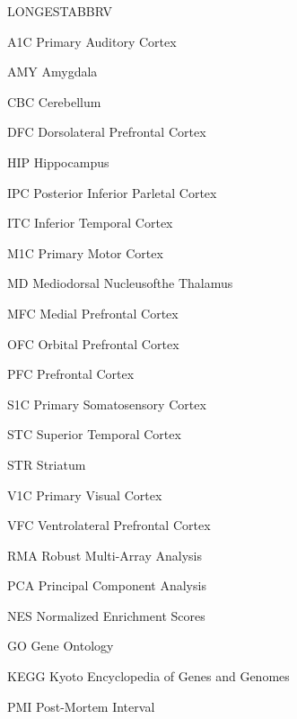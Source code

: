 \begin{theglossary}{LONGESTABBRV}

\item[A1C] Primary Auditory Cortex
\item[AMY] Amygdala
\item[CBC] Cerebellum
\item[DFC] Dorsolateral Prefrontal Cortex
\item[HIP] Hippocampus
\item[IPC] Posterior Inferior Parletal Cortex
\item[ITC] Inferior Temporal Cortex
\item[M1C] Primary Motor Cortex
\item[MD] Mediodorsal Nucleusofthe Thalamus
\item[MFC] Medial Prefrontal Cortex
\item[OFC] Orbital Prefrontal Cortex
\item[PFC] Prefrontal Cortex
\item[S1C] Primary Somatosensory Cortex
\item[STC] Superior Temporal Cortex
\item[STR] Striatum
\item[V1C] Primary Visual Cortex
\item[VFC] Ventrolateral Prefrontal Cortex
\item[RMA] Robust Multi-Array Analysis 
\item[PCA] Principal Component Analysis
\item[NES] Normalized Enrichment Scores
\item[GO] Gene Ontology
\item[KEGG] Kyoto Encyclopedia of Genes and Genomes
\item[PMI] Post-Mortem Interval

\end{theglossary}
